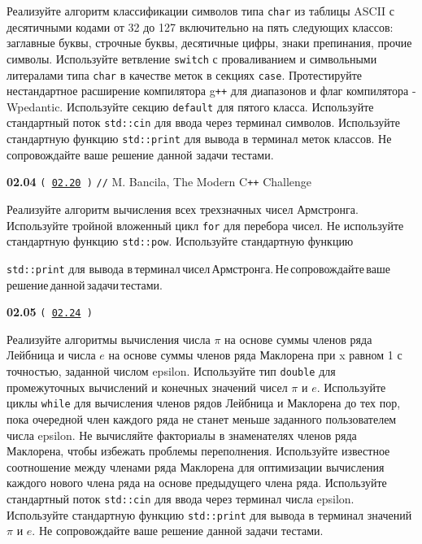 \documentclass[a4paper,12pt]{article}
\begin{document}
\bigskip

Реализуйте алгоритм классификации символов типа \lstinline{char} из таблицы ASCII с десятичными кодами от 32 до 127 включительно на пять следующих классов: заглавные буквы, строчные буквы, десятичные цифры, знаки препинания, прочие символы. Используйте ветвление \lstinline{switch} с проваливанием и символьными литералами типа \lstinline{char} в качестве меток в секциях \lstinline{case}. Протестируйте нестандартное расширение компилятора g\texttt{++} для диапазонов и флаг компилятора -Wpedantic. Используйте секцию \lstinline{default} для пятого класса. Используйте стандартный поток \lstinline{std::cin} для ввода через терминал символов. Используйте стандартную функцию \lstinline{std::print} для вывода в терминал меток классов. Не сопровождайте ваше решение данной задачи тестами.

\bigskip

{\large \textbf{02.04} \texttt{(\,\href{https://github.com/i-s-m-mipt/Education/blob/master/projects/examples/source/02.20.cpp}{02.20}\,)} \texttt{//} M. Bancila, The Modern C\texttt{++} Challenge}

\bigskip

Реализуйте алгоритм вычисления всех трехзначных чисел Армстронга. Используйте тройной вложенный цикл \lstinline{for} для перебора чисел. Не используйте стандартную функцию \lstinline{std::pow}. Используйте стандартную функцию 

\lstinline{std::print} для вывода в\,терминал\,чисел\,Армстронга.\,Не\,сопровождайте\,ваше\,решение\,данной\,задачи\,тестами.

\bigskip

{\large \textbf{02.05} \texttt{(\,\href{https://github.com/i-s-m-mipt/Education/blob/master/projects/examples/source/02.24.cpp}{02.24}\,)}}

\bigskip

Реализуйте алгоритмы вычисления числа $\pi$ на основе суммы членов ряда Лейбница и числа $e$ на основе суммы членов ряда Маклорена при x равном 1 с точностью, заданной числом epsilon. Используйте тип \lstinline{double} для промежуточных вычислений и конечных значений чисел $\pi$ и $e$. Используйте циклы \lstinline{while} для вычисления членов рядов Лейбница и Маклорена до тех пор, пока очередной член каждого ряда не станет меньше заданного пользователем числа epsilon. Не вычисляйте факториалы в знаменателях членов ряда Маклорена, чтобы избежать проблемы переполнения. Используйте известное соотношение между членами ряда Маклорена для оптимизации вычисления каждого нового члена ряда на основе предыдущего члена ряда. Используйте стандартный поток \lstinline{std::cin} для ввода через терминал числа epsilon. Используйте стандартную функцию \lstinline{std::print} для вывода в терминал значений $\pi$ и $e$. Не сопровождайте ваше решение данной задачи тестами.
\end{document}
